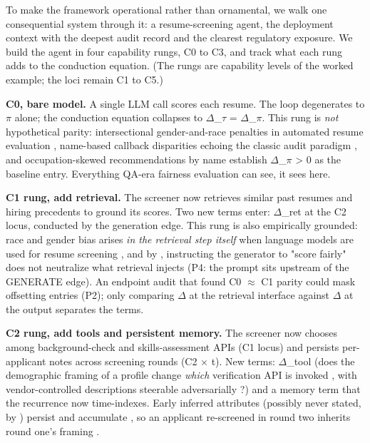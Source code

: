 \documentclass[10pt]{article}
\begin{document}
To make the framework operational rather than ornamental, we walk one consequential system through it: a resume-screening agent, the deployment context with the deepest audit record \cite{raghavan2020mitigating,veldanda2023emily,an2025measuring,nghiem2024you,wilson2024gender} and the clearest regulatory exposure. We build the agent in four capability rungs, C0 to C3, and track what each rung adds to the conduction equation. (The rungs are capability levels of the worked example; the loci remain C1 to C5.)

\textbf{C0, bare model.} A single LLM call scores each resume. The loop degenerates to $\pi$ alone; the conduction equation collapses to $\Delta$\_$\tau$ = $\Delta$\_$\pi$. This rung is \emph{not} hypothetical parity: intersectional gender-and-race penalties in automated resume evaluation \cite{an2025measuring}, name-based callback disparities echoing the classic audit paradigm \cite{veldanda2023emily}, and occupation-skewed recommendations by name \cite{nghiem2024you} establish $\Delta$\_$\pi$ > 0 as the baseline entry. Everything QA-era fairness evaluation can see, it sees here.

\textbf{C1 rung, add retrieval.} The screener now retrieves similar past resumes and hiring precedents to ground its scores. Two new terms enter: $\Delta$\_ret at the C2 locus, conducted by the generation edge. This rung is also empirically grounded: race and gender bias arises \emph{in the retrieval step itself} when language models are used for resume screening \cite{wilson2024gender}, and by \cite{hu2024free}, instructing the generator to "score fairly" does not neutralize what retrieval injects (P4: the prompt sits upstream of the GENERATE edge). An endpoint audit that found C0 $\approx$ C1 parity could mask offsetting entries (P2); only comparing $\Delta$ at the retrieval interface against $\Delta$ at the output separates the terms.

\textbf{C2 rung, add tools and persistent memory.} The screener now chooses among background-check and skills-assessment APIs (C1 locus) and persists per-applicant notes across screening rounds (C2 $\times$ t). New terms: $\Delta$\_tool (does the demographic framing of a profile change \emph{which} verification API is invoked \cite{blankenstein2025biasbusters}, with vendor-controlled descriptions steerable adversarially \cite{sneh2025tooltweak}?) and a memory term that the recurrence now time-indexes. Early inferred attributes (possibly never stated, by \cite{staab2023memorization}) persist and accumulate \cite{ma2026implicit}, so an applicant re-screened in round two inherits round one's framing \cite{simhi2026old}.
\end{document}
